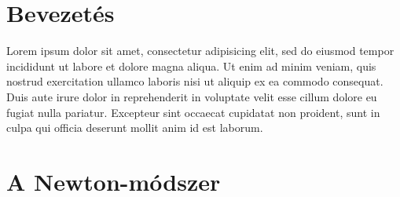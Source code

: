 \documentclass[a4paper,12pt]{report}
\begin{document}


%
%

	\chapter{Bevezetés}
		Lorem ipsum dolor sit amet, consectetur adipisicing elit, sed do eiusmod tempor incididunt ut labore et dolore magna aliqua. Ut enim ad minim veniam, quis nostrud exercitation ullamco laboris nisi ut aliquip ex ea commodo consequat. Duis aute irure dolor in reprehenderit in voluptate velit esse cillum dolore eu fugiat nulla pariatur. Excepteur sint occaecat cupidatat non proident, sunt in culpa qui officia deserunt mollit anim id est laborum.
	



%
%


	
	\chapter{A Newton-módszer}
    
    
        
        
\end{document}
